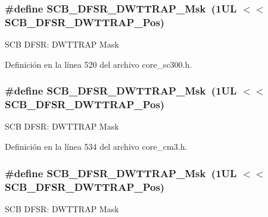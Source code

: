 \subsubsection[{\texorpdfstring{S\+C\+B\+\_\+\+D\+F\+S\+R\+\_\+\+D\+W\+T\+T\+R\+A\+P\+\_\+\+Msk}{SCB_DFSR_DWTTRAP_Msk}}]{\setlength{\rightskip}{0pt plus 5cm}\#define S\+C\+B\+\_\+\+D\+F\+S\+R\+\_\+\+D\+W\+T\+T\+R\+A\+P\+\_\+\+Msk~(1\+U\+L $<$$<$ S\+C\+B\+\_\+\+D\+F\+S\+R\+\_\+\+D\+W\+T\+T\+R\+A\+P\+\_\+\+Pos)}\hypertarget{group___c_m_s_i_s___s_c_b_ga3f7384b8a761704655fd45396a305663}{}\label{group___c_m_s_i_s___s_c_b_ga3f7384b8a761704655fd45396a305663}
S\+CB D\+F\+SR\+: D\+W\+T\+T\+R\+AP Mask 

Definición en la línea 520 del archivo core\+\_\+sc300.\+h.

\subsubsection[{\texorpdfstring{S\+C\+B\+\_\+\+D\+F\+S\+R\+\_\+\+D\+W\+T\+T\+R\+A\+P\+\_\+\+Msk}{SCB_DFSR_DWTTRAP_Msk}}]{\setlength{\rightskip}{0pt plus 5cm}\#define S\+C\+B\+\_\+\+D\+F\+S\+R\+\_\+\+D\+W\+T\+T\+R\+A\+P\+\_\+\+Msk~(1\+U\+L $<$$<$ S\+C\+B\+\_\+\+D\+F\+S\+R\+\_\+\+D\+W\+T\+T\+R\+A\+P\+\_\+\+Pos)}\hypertarget{group___c_m_s_i_s___s_c_b_ga3f7384b8a761704655fd45396a305663}{}\label{group___c_m_s_i_s___s_c_b_ga3f7384b8a761704655fd45396a305663}
S\+CB D\+F\+SR\+: D\+W\+T\+T\+R\+AP Mask 

Definición en la línea 534 del archivo core\+\_\+cm3.\+h.

\subsubsection[{\texorpdfstring{S\+C\+B\+\_\+\+D\+F\+S\+R\+\_\+\+D\+W\+T\+T\+R\+A\+P\+\_\+\+Msk}{SCB_DFSR_DWTTRAP_Msk}}]{\setlength{\rightskip}{0pt plus 5cm}\#define S\+C\+B\+\_\+\+D\+F\+S\+R\+\_\+\+D\+W\+T\+T\+R\+A\+P\+\_\+\+Msk~(1\+U\+L $<$$<$ S\+C\+B\+\_\+\+D\+F\+S\+R\+\_\+\+D\+W\+T\+T\+R\+A\+P\+\_\+\+Pos)}\hypertarget{group___c_m_s_i_s___s_c_b_ga3f7384b8a761704655fd45396a305663}{}\label{group___c_m_s_i_s___s_c_b_ga3f7384b8a761704655fd45396a305663}
S\+CB D\+F\+SR\+: D\+W\+T\+T\+R\+AP Mask 

